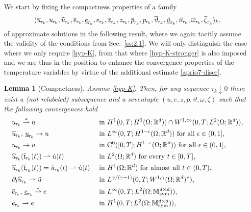 \documentclass[a4paper,10pt,reqno]{amsart}
\numberwithin{equation}{section}
\newcommand{\bbM}{\mathbb{M}}
\newcommand{\R}{\mathbb{R}}
\numberwithin{equation}{section}
\newtheorem{lemma}[theorem]{Lemma}
\newcommand{\weakto}{\rightharpoonup} %
\newcommand{\weaksto}{\overset{*}{\rightharpoonup}}
\newcommand{\teta}{\vartheta}
\newcommand{\piecewiseConstant}[2]{\overline{#1}_{\kern-1pt#2}}
\newcommand{\pwc}{\piecewiseConstant}
\newcommand{\upiecewiseConstant}[2]{\underline{#1}_{\kern-1pt#2}}
\newcommand{\upwc}{\upiecewiseConstant}
\newcommand{\piecewiseLinear}[2]{{#1}_{\kern-1pt#2}}
\newcommand{\pwl}{\piecewiseLinear}
\newcommand{\pwwll}[2]{\widehat{#1}_{\kern-1pt#2}}
\newcommand{\mt}{\bbM}
\newcommand{\sym}{\mathrm{sym}}
\newcommand{\uu}{u}
\begin{document}
\noindent
We start by fixing the compactness properties of a family
\[
(\pwc u{\tau_k}, \pwl u{\tau_k},   \pwwll  u{\tau_k},  \pwc e{\tau_k}, \upwc e{\tau_k},  \pwl e{\tau_k}, \pwc z{\tau_k}, \pwl z{\tau_k},  \pwc p{\tau_k}, \pwl p{\tau_k},
 \pwc\teta{\tau_k},  \upwc\teta{\tau_k}, \pwl{\teta}{\tau_k},  \pwc \omega{\tau_k}, \pwc \zeta{\tau_k})_k,
\]
 of approximate solutions
 in the following result, where we again tacitly assume the validity of
the conditions from Sec.\ \ref{ss:2.1}.
We will only distinguish the case where we only require \eqref{hyp-K}, from that where \eqref{hyp-K-stronger}   is also imposed and we are thus in the position to enhance the convergence properties of the temperature variables by virtue of the additional estimate \eqref{aprio7-discr}.
\begin{lemma}[Compactness]
\label{l:compactness}
Assume \eqref{hyp-K}. Then, for any sequence $\tau_k \downarrow 0$ there exist a (not relabeled) subsequence and a seventuple $(u, e, z, p,\teta, \omega,\zeta)$ such that the following convergences hold
\begin{subequations}
\label{convergences-cv}
\begin{align}
&
\label{cvU1}
 \pwl \uu{\tau_k} \weaksto \uu  &&  \text{ in $H^1(0,T;  H^1(\Omega;\R^d)) \cap
W^{1,\infty}(0,T;L^2(\Omega;\R^d))$,}
\\
&
\label{cvU2}
  \pwc \uu{\tau_k},\, \upwc \uu{\tau_k}  \to \uu &&
 \text{ in $L^\infty(0,T;H^{1-\epsilon}(\Omega;\R^d)) $ for all $\epsilon \in (0,1]$,}
 \\
 &
 \label{cvU3}
  \pwl \uu{\tau_k} 
\to \uu  && \text{ in $\mathrm{C}^0([0,T];H^{1-\epsilon}(\Omega;\R^d))  $ for all $\epsilon \in (0,1]$,}
 \\
  &
 \label{cvU3-bis}
\pwwll {u}{\tau_k}(\pwc{\mathsf{t}}{\tau_k}(t)) \weakto \dot{\uu}(t)  && 
\text{ in $L^2(\Omega;\R^d)$ for every $t\in [0,T]$,}
\\
 &
 \label{cvU3-ter}
\pwwll {u}{\tau_k}(\pwc{\mathsf{t}}{\tau_k}(t))=\pwl {\dot u}{\tau_k}(t) \weakto \dot{\uu} (t) && 
\text{ in $H^1(\Omega;\R^d)$ for almost all  $t\in (0,T)$,}
\\
&
\label{cvU4}
\partial_t \pwwll {\uu}{\tau_k} \weakto \ddot u &&
 \text{ in $L^{\gamma/(\gamma-1)}(0,T;W^{1,\gamma}(\Omega;\R^d)^*) $,}
 \\
&
\label{cvE1}
\pwc e{\tau_k}, \, \upwc e{\tau_k}  \weaksto e && \text{ in $L^\infty(0,T; L^2(\Omega;\mt_\sym^{d\times d}))$,}
\\
&
\label{cvE2}
\pwl e{\tau_k} \weakto e && \text{ in $H^1(0,T; L^2(\Omega;\mt_\sym^{d\times d}))$,}

\end{align}
\end{subequations}
\end{lemma}
\end{document}
